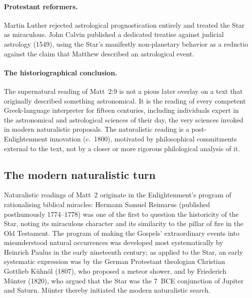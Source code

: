\documentclass[11pt,a4paper]{article}
\begin{document}
\paragraph{Protestant reformers.}
Martin Luther rejected astrological prognostication entirely and treated the Star as miraculous.
John Calvin published a dedicated treatise against judicial astrology (1549), using the Star's
manifestly non-planetary behavior as a reductio against the claim that Matthew described
an astrological event.

\paragraph{The historiographical conclusion.}
The supernatural reading of Matt~2:9 is not a pious later overlay on a text that originally
described something astronomical. It is the reading of every competent Greek-language
interpreter for fifteen centuries, including individuals expert in the astronomical and
astrological sciences of their day, the very sciences invoked in modern naturalistic
proposals. The naturalistic reading is a post-Enlightenment innovation (c.~1800),
motivated by philosophical commitments external to the text, not by a closer or more
rigorous philological analysis of it.

\subsection{The modern naturalistic turn}\label{subsec:modernturn}

Naturalistic readings of Matt~2 originate in the Enlightenment's program of rationalising
biblical miracles: Hermann Samuel Reimarus (published posthumously 1774--1778) was one of the first
to question the historicity of the Star, noting its miraculous character and its similarity
to the pillar of fire in the Old Testament. The program of making the Gospels' extraordinary
events into misunderstood natural occurrences was developed most systematically by Heinrich
Paulus in the early nineteenth century; as applied to the Star, an early systematic
expression was by the German Protestant theologian Christian Gottlieb K\"{u}hn\"{o}l (1807),
who proposed a meteor shower, and by Friederich M\"{u}nter (1820), who argued that the Star
was the 7~BCE conjunction of Jupiter and Saturn. M\"{u}nter thereby initiated the modern
naturalistic search.
\end{document}
